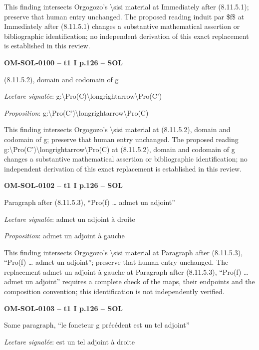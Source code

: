 This finding intersects Orgogozo's \textbackslash{}sisi material at Immediately after (8.11.5.1); preserve that human entry unchanged. The proposed reading induit par \$f\$ at Immediately after (8.11.5.1) changes a substantive mathematical assertion or bibliographic identification; no independent derivation of this exact replacement is established in this review.\par
\par\noindent\textbf{OM-SOL-0100 -- t1 I p.126 -- SOL}\par
(8.11.5.2), domain and codomain of g\par
\emph{Lecture signalée}: g:\textbackslash{}Pro(C)\textbackslash{}longrightarrow\textbackslash{}Pro(C')\par
\emph{Proposition}: g:\textbackslash{}Pro(C')\textbackslash{}longrightarrow\textbackslash{}Pro(C)\par
This finding intersects Orgogozo's \textbackslash{}sisi material at (8.11.5.2), domain and codomain of g; preserve that human entry unchanged. The proposed reading g:\textbackslash{}Pro(C')\textbackslash{}longrightarrow\textbackslash{}Pro(C) at (8.11.5.2), domain and codomain of g changes a substantive mathematical assertion or bibliographic identification; no independent derivation of this exact replacement is established in this review.\par
\par\noindent\textbf{OM-SOL-0102 -- t1 I p.126 -- SOL}\par
Paragraph after (8.11.5.3), “Pro(f) … admet un adjoint”\par
\emph{Lecture signalée}: admet un adjoint à droite\par
\emph{Proposition}: admet un adjoint à gauche\par
This finding intersects Orgogozo's \textbackslash{}sisi material at Paragraph after (8.11.5.3), “Pro(f) … admet un adjoint”; preserve that human entry unchanged. The replacement admet un adjoint à gauche at Paragraph after (8.11.5.3), “Pro(f) … admet un adjoint” requires a complete check of the maps, their endpoints and the composition convention; this identification is not independently verified.\par
\par\noindent\textbf{OM-SOL-0103 -- t1 I p.126 -- SOL}\par
Same paragraph, “le foncteur g précédent est un tel adjoint”\par
\emph{Lecture signalée}: est un tel adjoint à droite\par
